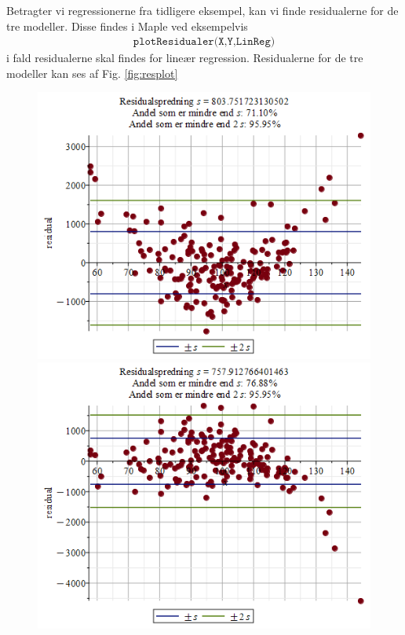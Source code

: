 \begin{exa}
Betragter vi regressionerne fra tidligere eksempel, kan vi finde residualerne for de tre modeller. Disse findes i Maple ved eksempelvis
\begin{align*}
	\texttt{plotResidualer(X,Y,LinReg)} 
\end{align*}
 i fald residualerne skal findes for lineær regression. Residualerne for de tre modeller kan ses af Fig. \ref{fig:resplot}
\begin{figure}[H]
\centering
\includegraphics[width = \textwidth*4/10]{Billeder/LinRegResidual.png}
\includegraphics[width = \textwidth*4/10]{Billeder/ExpRegResidual.png}

\end{figure}
\end{exa}
